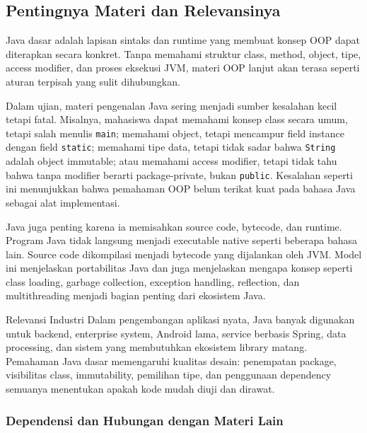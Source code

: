 \subsection{Pentingnya Materi dan Relevansinya}

\begin{jawab}
Java dasar adalah lapisan sintaks dan runtime yang membuat konsep OOP dapat diterapkan secara konkret. Tanpa memahami struktur class, method, object, tipe, access modifier, dan proses eksekusi JVM, materi OOP lanjut akan terasa seperti aturan terpisah yang sulit dihubungkan.
\end{jawab}

Dalam ujian, materi pengenalan Java sering menjadi sumber kesalahan kecil tetapi fatal. Misalnya, mahasiswa dapat memahami konsep class secara umum, tetapi salah menulis \texttt{main}; memahami object, tetapi mencampur field instance dengan field \texttt{static}; memahami tipe data, tetapi tidak sadar bahwa \texttt{String} adalah object immutable; atau memahami access modifier, tetapi tidak tahu bahwa tanpa modifier berarti package-private, bukan \texttt{public}. Kesalahan seperti ini menunjukkan bahwa pemahaman OOP belum terikat kuat pada bahasa Java sebagai alat implementasi.

Java juga penting karena ia memisahkan source code, bytecode, dan runtime. Program Java tidak langsung menjadi executable native seperti beberapa bahasa lain. Source code dikompilasi menjadi bytecode yang dijalankan oleh JVM. Model ini menjelaskan portabilitas Java dan juga menjelaskan mengapa konsep seperti class loading, garbage collection, exception handling, reflection, dan multithreading menjadi bagian penting dari ekosistem Java.

\begin{cmt}{Relevansi Industri}{}
Dalam pengembangan aplikasi nyata, Java banyak digunakan untuk backend, enterprise system, Android lama, service berbasis Spring, data processing, dan sistem yang membutuhkan ekosistem library matang. Pemahaman Java dasar memengaruhi kualitas desain: penempatan package, visibilitas class, immutability, pemilihan tipe, dan penggunaan dependency semuanya menentukan apakah kode mudah diuji dan dirawat.
\end{cmt}

\subsubsection{Dependensi dan Hubungan dengan Materi Lain}

